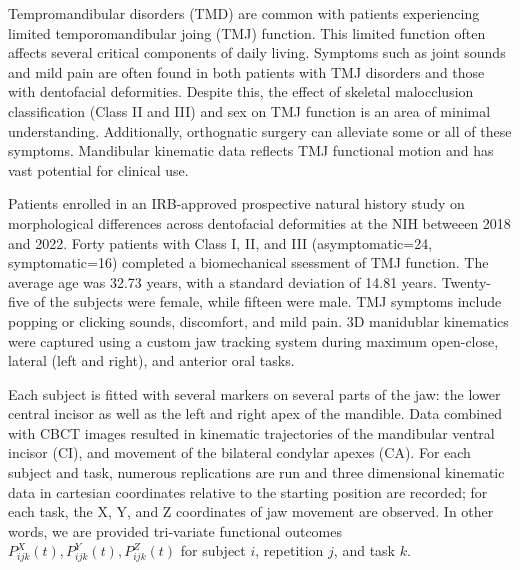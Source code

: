 Tempromandibular disorders (TMD) are common with patients experiencing limited temporomandibular joing (TMJ) function.  
This limited function often affects several critical components of daily living.  
Symptoms such as joint sounds and mild pain are often found in both patients with TMJ disorders and those with dentofacial deformities.  
Despite this, the effect of skeletal malocclusion classification (Class II and III) and sex on TMJ function is an area of minimal 
understanding.  Additionally, orthognatic surgery can alleviate some or all of these symptoms.  Mandibular kinematic data reflects 
TMJ functional motion and has vast potential for clinical use.  

Patients enrolled in an IRB-approved prospective natural history study on morphological differences across dentofacial deformities at 
the NIH betweeen 2018 and 2022.  Forty patients with Class I, II, and III (asymptomatic=24, symptomatic=16) completed a biomechanical 
ssessment of TMJ function.  The average age was 32.73 years, with a standard deviation of 14.81 years.  
Twenty-five of the subjects were female, while fifteen were male.  TMJ symptoms include popping or clicking sounds, discomfort, 
and mild pain.  3D manidublar kinematics were captured using a custom jaw tracking system during maximum open-close, lateral 
(left and right), and anterior oral tasks.  

Each subject is fitted with several markers on several parts of the jaw: the lower central incisor as well as the left and right 
apex of the mandible.  Data combined with CBCT images resulted in kinematic trajectories of the mandibular ventral incisor (CI), 
and movement of the bilateral condylar apexes (CA).  For each subject and task, numerous replications are run and three dimensional 
kinematic data in cartesian coordinates relative to the starting position are recorded; for each task, the X, Y, and Z coordinates of 
jaw movement are observed.  In other words, we are provided tri-variate functional outcomes \(P_{ijk}^X(t), P_{ijk}^Y(t), P_{ijk}^Z(t)\) 
for subject \(i\), repetition \(j\), and task \(k\).